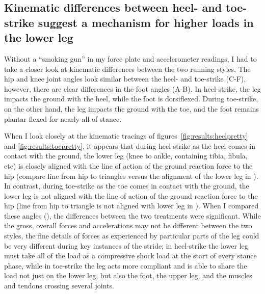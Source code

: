 \subsection{Kinematic differences between heel- and toe-strike suggest a mechanism for higher loads in the lower leg}

Without a ``smoking gun'' in my force plate and accelerometer readings, I had to take a closer look at kinematic differences between the two running styles. The hip and knee joint angles look similar between the heel- and toe-strike (C-F), however, there are clear differences in the foot angles (A-B). In heel-strike, the leg impacts the ground with the heel, while the foot is dorsiflexed. During toe-strike, on the other hand, the leg impacts the ground with the toe, and the foot remains plantar flexed for nearly all of stance.

When I look closely at the kinematic tracings of figures~\ref{fig:results:heelpretty} and \ref{fig:results:toepretty}, it appears that during heel-strike as the heel comes in contact with the ground, the lower leg (knee to ankle, containing tibia, fibula, etc) is closely aligned with the line of action of the ground reaction force to the hip (compare line from hip to triangles versus the alignment of the lower leg in ). In contrast, during toe-strike as the toe comes in contact with the ground, the lower leg is not aligned with the line of action of the ground reaction force to the hip (line from hip to triangle is not aligned with lower leg in ). When I compared these angles (), the differences between the two treatments were significant. While the gross, overall forces and accelerations may not be different between the two styles, the fine details of forces as experienced by particular parts of the leg could be very different during key instances of the stride; in heel-strike the lower leg must take all of the load as a compressive shock load at the start of every stance phase, while in toe-strike the leg acts more compliant and is able to share the load not just on the lower leg, but also the foot, the upper leg, and the muscles and tendons crossing several joints. 

